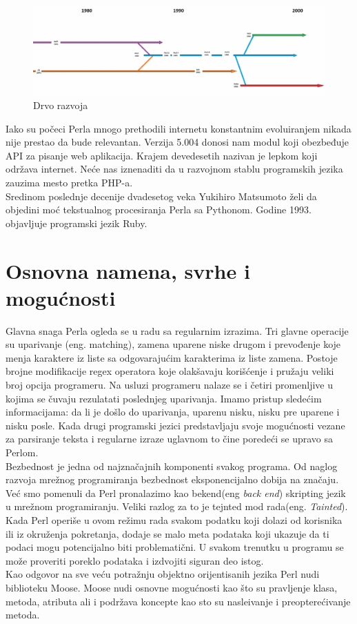 \documentclass[a4paper]{article}
\begin{document}
\begin{figure}[H]
\centering
\includegraphics[scale=0.23]{drvorazvoja.jpg}
\caption{Drvo razvoja}
\end{figure}
Iako su počeci Perla mnogo prethodili internetu konstantnim evoluiranjem nikada nije prestao da bude relevantan. Verzija 5.004 donosi nam modul koji obezbeđuje API za pisanje web aplikacija. Krajem devedesetih nazivan je lepkom koji održava internet. Neće nas iznenaditi da u razvojnom stablu programskih jezika zauzima mesto pretka PHP-a.\\
Sredinom poslednje decenije dvadesetog veka Yukihiro Matsumoto želi da objedini moć tekstualnog procesiranja Perla sa Pythonom. Godine 1993. objavljuje programski jezik Ruby.



\section{Osnovna namena, svrhe i mogu\'cnosti}
\label{sec:namena}

Glavna snaga Perla ogleda se u radu sa regularnim izrazima. Tri glavne operacije su uparivanje (eng. matching), zamena uparene niske drugom i prevođenje koje menja karaktere iz liste sa odgovarajućim karakterima iz liste zamena\cite{id}. Postoje brojne modifikacije regex operatora koje olakšavaju korišćenje i pružaju veliki broj opcija programeru. Na usluzi programeru nalaze se i četiri promenljive u kojima se čuvaju rezulatati poslednjeg uparivanja. Imamo pristup sledećim informacijama: da li je došlo do uparivanja, uparenu nisku, nisku pre uparene i nisku posle\cite{friedl2006mastering}. Kada drugi programski jezici predstavljaju svoje mogućnosti vezane za parsiranje teksta i regularne izraze uglavnom to čine poredeći se upravo sa Perlom.\\
Bezbednost je jedna od najznačajnih komponenti svakog programa. Od naglog razvoja mrežnog programiranja bezbednost eksponencijalno dobija na značaju. Već smo pomenuli da Perl pronalazimo kao bekend(eng {\em back end}) skripting jezik u mrežnom programiranju. Veliki razlog za to je tejnted mod rada(eng. {\em Tainted}). Kada Perl operiše u ovom režimu rada svakom podatku koji dolazi od korisnika ili iz okruženja pokretanja, dodaje se malo meta podataka koji ukazuje da ti podaci mogu potencijalno biti problematični. U svakom trenutku u programu se mo\v ze proveriti poreklo podataka i izdvojiti siguran deo istog\cite{modern}.\\
Kao odgovor na sve veću potražnju objektno orijentisanih jezika Perl nudi biblioteku Moose. Moose nudi osnovne mogu\'cnosti kao \v sto su pravljenje klasa, metoda, atributa ali i podržava koncepte kao sto su nasle\dj{}ivanje i preopterećivanje metoda. 
\end{document}

